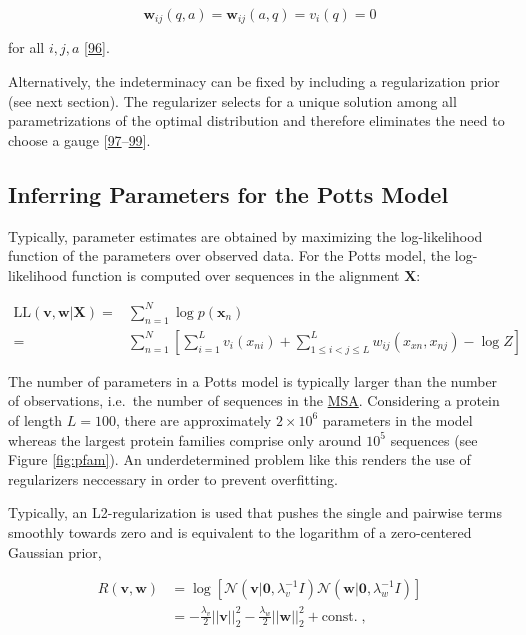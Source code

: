\documentclass[11pt,a4paper,twoside]{book}
\newcommand{\seq}{\mathbf{x}}
\renewcommand{\v}{\mathbf{v}}
\newcommand{\vi}{v_{i}}
\newcommand{\w}{\mathbf{w}}
\newcommand{\wij}{\mathbf{w}_{ij}}
\theoremstyle{definition}
\theoremstyle{definition}
\theoremstyle{remark}
\begin{document}
\begin{equation}
    \wij(q,a) = \wij(a,q) = \vi(q) = 0
\label{eq:ising-gauge}
\end{equation}

for all \(i,j,a\) {[}\protect\hyperlink{ref-Cocco2017}{96}{]}.

Alternatively, the indeterminacy can be fixed by including a
regularization prior (see next section). The regularizer selects for a
unique solution among all parametrizations of the optimal distribution
and therefore eliminates the need to choose a gauge
{[}\protect\hyperlink{ref-Koller2009}{97}--\protect\hyperlink{ref-Stein2015a}{99}{]}.

\subsection{Inferring Parameters for the Potts Model}\label{potts-mle}

Typically, parameter estimates are obtained by maximizing the
log-likelihood function of the parameters over observed data. For the
Potts model, the log-likelihood function is computed over sequences in
the alignment \(\mathbf{X}\):

\begin{align}
    \text{LL}(\v, \w | \mathbf{X}) =& \sum_{n=1}^N \log p(\seq_n)  \nonumber\\
    =& \sum_{n=1}^N \left[ \sum_{i=1}^L v_i(x_{ni}) + \sum_{1 \leq i < j \leq L}^L w_{ij}(x_{xn}, x_{nj}) - \log Z \right]
\label{eq:full-log-likelihood}
\end{align}

The number of parameters in a Potts model is typically larger than the
number of observations, i.e.~the number of sequences in the
\protect\hyperlink{abbrev}{MSA}. Considering a protein of length
\(L=100\), there are approximately \(2 \times 10^6\) parameters in the
model whereas the largest protein families comprise only around \(10^5\)
sequences (see Figure \ref{fig:pfam}). An underdetermined problem like
this renders the use of regularizers neccessary in order to prevent
overfitting.

Typically, an L2-regularization is used that pushes the single and
pairwise terms smoothly towards zero and is equivalent to the logarithm
of a zero-centered Gaussian prior,

\begin{align}
  R(\v, \w)  &= \log \left[ \mathcal{N}(\v | \mathbf{0}, \lambda_v^{-1} I) \mathcal{N}(\w | \mathbf{0}, \lambda_w^{-1} I) \right] \nonumber \\
             &= -\frac{\lambda_v}{2} ||\v||_2^2 - \frac{\lambda_w}{2} ||\w||_2^2 + \text{const.} \; ,
\label{eq:l2-reg}
\end{align}
\end{document}
